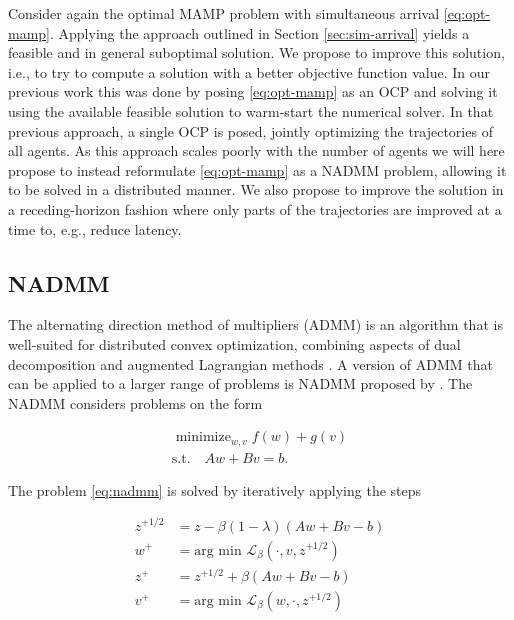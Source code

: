 \documentclass[letterpaper, 10 pt, conference]{ieeeconf}  %
\DeclareMathOperator*{\minimize}{minimize}
\begin{document}
Consider again the optimal MAMP problem with simultaneous arrival \eqref{eq:opt-mamp}. Applying the approach outlined in Section \ref{sec:sim-arrival} yields a feasible and in general suboptimal solution. We propose to improve this solution, i.e., to try to compute a solution with a better objective function value. In our previous work \cite{hellander2026optimized} this was done by posing \eqref{eq:opt-mamp} as an OCP and solving it using the available feasible solution to warm-start the numerical solver. In that previous approach, a single OCP is posed, jointly optimizing the trajectories of all agents. As this approach scales poorly with the number of agents we will here propose to instead reformulate \eqref{eq:opt-mamp} as a NADMM problem, allowing it to be solved in a distributed manner. We also propose to improve the solution in a receding-horizon fashion where only parts of the trajectories are improved at a time to, e.g., reduce latency.



\subsection{NADMM}

The alternating direction method of multipliers (ADMM) is an algorithm that is well-suited for distributed convex optimization, combining aspects of dual decomposition and augmented Lagrangian methods \cite{boyd2010distributed}. A version of ADMM that can be applied to a larger range of problems is NADMM proposed by \cite{themelis2020douglas}. The NADMM considers problems on the form

\begin{subequations}
\label{eq:nadmm}
\begin{align}
\minimize_{w, v} f(w) + g(v) \\
\text{s.t.} \quad Aw + Bv = b.
\end{align}
\end{subequations}

The problem \eqref{eq:nadmm} is solved by iteratively applying the steps

\begin{equation}
\begin{aligned}
z^{+1/2} &= z - \beta (1 - \lambda) (Aw + Bv - b) \\
w^+ &= \text{arg min } \mathcal{L}_\beta (\cdot, v, z^{+1/2}) \\
z^+ &= z^{+1/2} + \beta (Aw + Bv - b) \\
v^+ &= \text{arg min } \mathcal{L}_\beta (w, \cdot, z^{+1/2}) \\
\end{aligned}
\end{equation}
\end{document}

